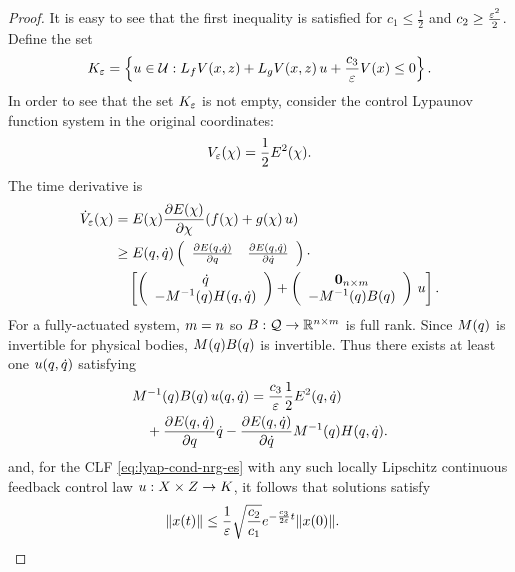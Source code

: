 \documentclass[twocolumn]{article}
\begin{document}
\begin{proof}
  It is easy to see that the first inequality is satisfied for $c_{1} \leq \frac{1}{2}$ and $c_{2} \geq \frac{\varepsilon^{2}}{2}$.
  Define the set
  \begin{align}
    K_{\varepsilon} = \left\{ u \in \mathcal{U} : L_{f} V(x, z) + L_{g} V(x, z) \, u + \frac{c_{3}}{\varepsilon} V(x) \leq 0 \right\}.
    \label{eq:control-set}
  \end{align}
  In order to see that the set $K_{\varepsilon}$ is not empty, consider the control Lypaunov function system in the original coordinates:
  \begin{align}
    V_{\varepsilon}(\chi) = \frac{1}{2} E^{2}(\chi).
  \end{align}
  The time derivative is
  \begin{align}
    {\dot V}_{\varepsilon}(\chi) &= E(\chi) \frac{\partial{E(\chi)}}{\partial{\chi}}(f(\chi) + g(\chi) \, u)\\
    \nonumber
    &\geq E(q, \dot{q}) \left(\begin{array}{c c}
      \frac{\partial{E(q, \dot{q})}}{\partial{q}} & \frac{\partial{E(q, \dot{q})}}{\partial{\dot{q}}}
    \end{array}\right) \cdot\\
    \nonumber
    & \hspace{1em} \left[
    \left(\begin{array}{c}
      \dot{q}\\
      -M^{-1}(q) H(q, \dot{q})
    \end{array}\right) +
    \left(\begin{array}{c}
      {\mathbf 0}_{n \times m}\\
      -M^{-1}(q) B(q)
    \end{array}\right) \, u
    \right].
  \end{align}
  For a fully-actuated system, $m = n$ so $B : \mathcal{Q} \to \mathbb{R}^{n \times m}$ is full rank.
  Since $M(q)$ is invertible for physical bodies, $M(q) B(q)$ is invertible.
  Thus there exists at least one $u(q, \dot{q})$ satisfying
  \begin{align}
    \lefteqn{\M^{-1}(\q) \B(\q) \, \u(\q, \dq) = \frac{c_{3}}{\resclfparam} \frac{1}{2} \E^{2}(\q, \dq)}\\
    \nonumber
      && \mbox{} + \pd{\E(\q, \dq)}{\q} \dq - \pd{\E(\q, \dq)}{\dq} \M^{-1}(\q) \CG(\q, \dq).
  \end{align}
  and, for the CLF \eqref{eq:lyap-cond-nrg-es} with any such locally Lipschitz continuous feedback control law $u : X \times Z \to K$, it follows that solutions satisfy
  \begin{align*}
    \| x(t) \| \leq \frac{1}{\varepsilon} \sqrt{\frac{c_{2}}{c_{1}}} e^{-\frac{c_{3}}{2\varepsilon} t} \| x(0) \|. & \qedhere
  \end{align*}
\end{proof}
\end{document}
